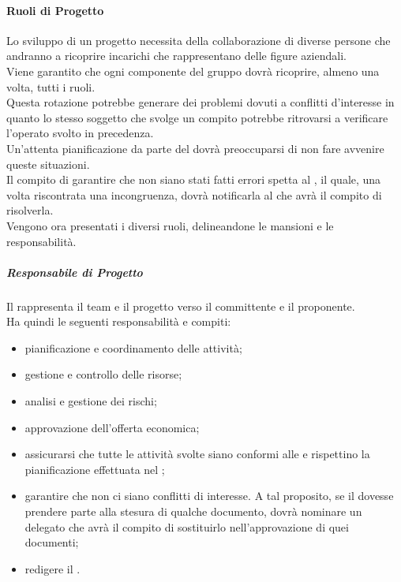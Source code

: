 			\paragraph{Ruoli di Progetto}
			Lo sviluppo di un progetto necessita della collaborazione di diverse persone che andranno a ricoprire incarichi che rappresentano delle figure aziendali. \\
			Viene garantito che ogni componente del gruppo \groupName{} dovrà ricoprire, almeno una volta, tutti i ruoli. \\
			Questa rotazione potrebbe generare dei problemi dovuti a conflitti d'interesse in quanto lo stesso soggetto che svolge un compito potrebbe ritrovarsi a verificare l'operato svolto in precedenza. \\
			Un'attenta pianificazione da parte del \roleProjectManager{} dovrà preoccuparsi di non fare avvenire queste situazioni. \\
			Il compito di garantire che non siano stati fatti errori spetta al \roleVerifier, il quale, una volta riscontrata una incongruenza, dovrà notificarla al \roleProjectManager{} che avrà il compito di risolverla. \\ 
			Vengono ora presentati i diversi ruoli, delineandone le mansioni e le responsabilità.
				\subparagraph{Responsabile di Progetto}
				Il \roleProjectManager{} rappresenta il team e il progetto verso il committente\gloss{} e il proponente\gloss{}. \\
				Ha quindi le seguenti responsabilità e compiti:
					\begin{itemize}
						\item pianificazione e coordinamento delle attività;
						\item gestione e controllo delle risorse;
						\item analisi e gestione dei rischi;
						\item approvazione dell'offerta economica;
						\item assicurarsi che tutte le attività svolte siano conformi alle \docNameVersionNdP{} e rispettino la pianificazione effettuata nel \docNameVersionPdP;
						\item garantire che non ci siano conflitti di interesse. A tal proposito, se il \roleProjectManager{} dovesse prendere parte alla stesura di qualche documento, dovrà nominare un \roleProjectManager{} delegato che avrà il compito di sostituirlo nell'approvazione di quei documenti;
						\item redigere il \docNameVersionPdP.
					\end{itemize}
					
